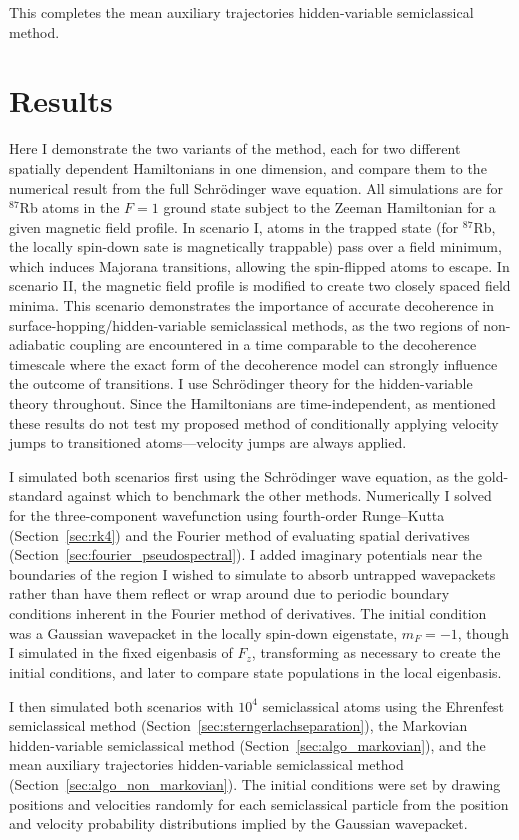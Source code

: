 This completes the mean auxiliary trajectories hidden-variable semiclassical method.

\section{Results}\label{sec:HVSC_results}

Here I demonstrate the two variants of the method, each for two different spatially dependent Hamiltonians in one dimension, and compare them to the numerical result from the full Schr\"odinger wave equation. All simulations are for $^{87}$Rb atoms in the $F=1$ ground state subject to the Zeeman Hamiltonian for a given magnetic field profile. In scenario I, atoms in the trapped state (for $^{87}$Rb, the locally spin-down sate is magnetically trappable) pass over a field minimum, which induces Majorana transitions, allowing the spin-flipped atoms to escape. In scenario II, the magnetic field profile is modified to create two closely spaced field minima. This scenario demonstrates the importance of accurate decoherence in surface-hopping/hidden-variable semiclassical methods, as the two regions of non-adiabatic coupling are encountered in a time comparable to the decoherence timescale where the exact form of the decoherence model can strongly influence the outcome of transitions. I use Schr\"odinger theory for the hidden-variable theory throughout. Since the Hamiltonians are time-independent, as mentioned these results do not test my proposed method of conditionally applying velocity jumps to transitioned atoms---velocity jumps are always applied.

I simulated both scenarios first using the Schr\"odinger wave equation, as the gold-standard against which to benchmark the other methods. Numerically I solved for the three-component wavefunction using fourth-order Runge--Kutta (Section~\ref{sec:rk4}) and the Fourier method of evaluating spatial derivatives (Section~\ref{sec:fourier_pseudospectral}). I added imaginary potentials near the boundaries of the region I wished to simulate to absorb untrapped wavepackets rather than have them reflect or wrap around due to periodic boundary conditions inherent in the Fourier method of derivatives. The initial condition was a Gaussian wavepacket in the locally spin-down eigenstate, $m_F = -1$, though I simulated in the fixed eigenbasis of $\hat F_z$, transforming as necessary to create the initial conditions, and later to compare state populations in the local eigenbasis.

I then simulated both scenarios with $10^4$ semiclassical atoms using the Ehrenfest semiclassical method (Section~\ref{sec:sterngerlachseparation}), the Markovian hidden-variable semiclassical method (Section~\ref{sec:algo_markovian}), and the mean auxiliary trajectories hidden-variable semiclassical method (Section~\ref{sec:algo_non_markovian}). The initial conditions were set by drawing positions and velocities randomly for each semiclassical particle from the position and velocity probability distributions implied by the Gaussian wavepacket.

